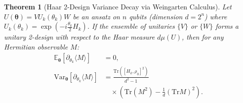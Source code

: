 \documentclass[pdflatex,sn-mathphys-num]{sn-jnl}%
\theoremstyle{thmstyleone}%
\newtheorem{theorem}{Theorem}%
\theoremstyle{thmstyletwo}%
\theoremstyle{thmstylethree}%
\begin{document}
\begin{theorem}[Haar 2-Design Variance Decay via Weingarten Calculus]
Let $U(\boldsymbol{\theta}) = V U_k(\theta_k) W$ be an ansatz on $n$ qubits (dimension $d = 2^n$) where $U_k(\theta_k) = \exp(-i \frac{\theta_k}{2} H_k)$. If the ensemble of unitaries $\{V\}$ or $\{W\}$ forms a unitary 2-design with respect to the Haar measure $d\mu(U)$, then for any Hermitian observable $M$:
\begin{align}
\mathbb{E}_{\boldsymbol{\theta}}\left[ \partial_{\theta_k} \langle M \rangle \right] &= 0, \\
\mathrm{Var}_{\boldsymbol{\theta}}\left[ \partial_{\theta_k} \langle M \rangle \right] &= \frac{\mathrm{Tr}\left([H_k, \rho_0]^2\right)}{d^2 - 1} \nonumber \\
&\quad \times \left( \mathrm{Tr}(M^2) - \frac{1}{d}(\mathrm{Tr} M)^2 \right).
\label{eq:weingarten_exact_variance}
\end{align}
\end{theorem}
\end{document}
